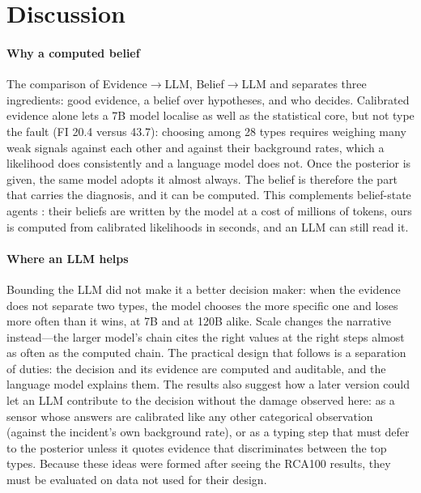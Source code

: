 \section{Discussion}\label{sec:discussion}

\paragraph{Why a computed belief}
The comparison of Evidence$\rightarrow$LLM, Belief$\rightarrow$LLM and \core{} separates three ingredients: good evidence, a belief
over hypotheses, and who decides. Calibrated evidence alone lets a 7B model localise as well as the statistical core, but not type
the fault (FI 20.4 versus 43.7): choosing among 28 types requires weighing many weak signals against each other and against their
background rates, which a likelihood does consistently and a language model does not. Once the posterior is given, the same model
adopts it almost always. The belief is therefore the part that carries the diagnosis, and it can be computed. This complements
belief-state agents \citep{luo2026pos,luo2026graphofstates}: their beliefs are written by the model at a cost of millions of tokens,
ours is computed from calibrated likelihoods in seconds, and an LLM can still read it.

\paragraph{Where an LLM helps}
Bounding the LLM did not make it a better decision maker: when the evidence does not separate two types, the model chooses the more
specific one and loses more often than it wins, at 7B and at 120B alike. Scale changes the narrative instead---the larger model's
chain cites the right values at the right steps almost as often as the computed chain. The practical design that follows is a
separation of duties: the decision and its evidence are computed and auditable, and the language model explains them. The results
also suggest how a later version could let an LLM contribute to the decision without the damage observed here: as a sensor whose
answers are calibrated like any other categorical observation (against the incident's own background rate), or as a typing step
that must defer to the posterior unless it quotes evidence that discriminates between the top types. Because these ideas were
formed after seeing the RCA100 results, they must be evaluated on data not used for their design.

